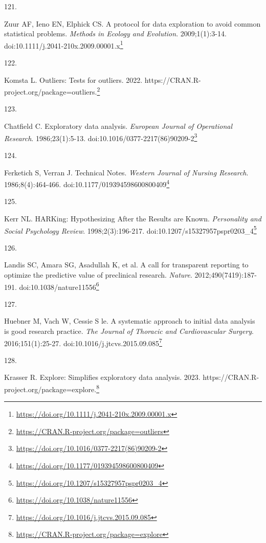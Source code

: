 \documentclass[
  a4paper,
]{book}
\newlength{\cslhangindent}
\newlength{\csllabelwidth}
\newlength{\cslentryspacingunit} %
\newenvironment{CSLReferences}[2] %
 {%
  \setlength{\parindent}{0pt}
  \ifodd #1
  \let\oldpar\par
  \def\par{\hangindent=\cslhangindent\oldpar}
  \fi
  \setlength{\parskip}{#2\cslentryspacingunit}
 }%
 {}
\newcommand{\CSLLeftMargin}[1]{\parbox[t]{\csllabelwidth}{#1}}
\newcommand{\CSLRightInline}[1]{\parbox[t]{\linewidth - \csllabelwidth}{#1}\break}
\renewcommand{\href}[2]{#2\footnote{\url{#1}}}
\begin{document}
\begin{CSLReferences}{0}{0}
\leavevmode{}%
\CSLLeftMargin{121. }%
\CSLRightInline{Zuur AF, Ieno EN, Elphick CS. A protocol for data exploration to avoid common statistical problems. \emph{Methods in Ecology and Evolution}. 2009;1(1):3-14. doi:\href{https://doi.org/10.1111/j.2041-210x.2009.00001.x}{10.1111/j.2041-210x.2009.00001.x}}

\leavevmode{}%
\CSLLeftMargin{122. }%
\CSLRightInline{Komsta L. Outliers: Tests for outliers. 2022. \href{https://CRAN.R-project.org/package=outliers}{https://CRAN.R-project.org/package=outliers.}}

\leavevmode{}%
\CSLLeftMargin{123. }%
\CSLRightInline{Chatfield C. Exploratory data analysis. \emph{European Journal of Operational Research}. 1986;23(1):5-13. doi:\href{https://doi.org/10.1016/0377-2217(86)90209-2}{10.1016/0377-2217(86)90209-2}}

\leavevmode{}%
\CSLLeftMargin{124. }%
\CSLRightInline{Ferketich S, Verran J. Technical Notes. \emph{Western Journal of Nursing Research}. 1986;8(4):464-466. doi:\href{https://doi.org/10.1177/019394598600800409}{10.1177/019394598600800409}}

\leavevmode{}%
\CSLLeftMargin{125. }%
\CSLRightInline{Kerr NL. HARKing: Hypothesizing After the Results are Known. \emph{Personality and Social Psychology Review}. 1998;2(3):196-217. doi:\href{https://doi.org/10.1207/s15327957pspr0203_4}{10.1207/s15327957pspr0203\_4}}

\leavevmode{}%
\CSLLeftMargin{126. }%
\CSLRightInline{Landis SC, Amara SG, Asadullah K, et al. A call for transparent reporting to optimize the predictive value of preclinical research. \emph{Nature}. 2012;490(7419):187-191. doi:\href{https://doi.org/10.1038/nature11556}{10.1038/nature11556}}

\leavevmode{}%
\CSLLeftMargin{127. }%
\CSLRightInline{Huebner M, Vach W, Cessie S le. A systematic approach to initial data analysis is good research practice. \emph{The Journal of Thoracic and Cardiovascular Surgery}. 2016;151(1):25-27. doi:\href{https://doi.org/10.1016/j.jtcvs.2015.09.085}{10.1016/j.jtcvs.2015.09.085}}

\leavevmode{}%
\CSLLeftMargin{128. }%
\CSLRightInline{Krasser R. Explore: Simplifies exploratory data analysis. 2023. \href{https://CRAN.R-project.org/package=explore}{https://CRAN.R-project.org/package=explore.}}


\end{CSLReferences}
\end{document}

